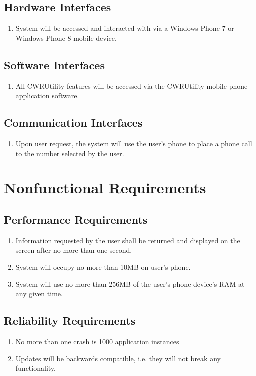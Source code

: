 \documentclass[pdftex,12pt,letter]{article}
\begin{document}
\subsection{Hardware Interfaces}
\begin{enumerate}[HI-1:]
\item System will be accessed and interacted with via a Windows Phone 7 or Windows Phone 8 mobile device.
\end{enumerate}
\subsection{Software Interfaces}
\begin{enumerate}
\item All CWRUtility features will be accessed via the CWRUtility mobile phone application software.
\end{enumerate}
\subsection{Communication Interfaces}
\begin{enumerate}[CI-1]
\item Upon user request, the system will use the user's phone to place a phone call to the number selected by the user.
\end{enumerate}
\section{Nonfunctional Requirements}
\subsection{Performance Requirements}
\begin{enumerate}[PR-1:]
\item Information requested by the user shall be returned and displayed on the screen after no more than one second.
\item System will occupy no more than 10MB on user's phone.
\item System will use no more than 256MB of the user's phone device's RAM at any given time.
\end{enumerate}
\subsection{Reliability Requirements}
\begin{enumerate}[RR-1:]
\item No more than one crash is 1000 application instances
\item Updates will be backwards compatible, i.e. they will not break any functionality.
\end{enumerate}
\end{document}
